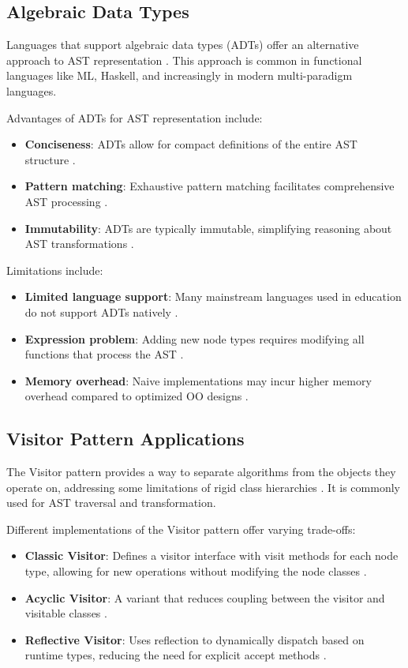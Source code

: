 \subsection{Algebraic Data Types}

Languages that support algebraic data types (ADTs) offer an alternative approach to AST representation \cite{krishnamurthi2007programming}. This approach is common in functional languages like ML, Haskell, and increasingly in modern multi-paradigm languages.

Advantages of ADTs for AST representation include:
\begin{itemize}
    \item \textbf{Conciseness}: ADTs allow for compact definitions of the entire AST structure \cite{krishnamurthi2007programming}.
    \item \textbf{Pattern matching}: Exhaustive pattern matching facilitates comprehensive AST processing \cite{odersky2004overview}.
    \item \textbf{Immutability}: ADTs are typically immutable, simplifying reasoning about AST transformations \cite{okasaki1999purely}.
\end{itemize}

Limitations include:
\begin{itemize}
    \item \textbf{Limited language support}: Many mainstream languages used in education do not support ADTs natively \cite{krishnamurthi2007programming}.
    \item \textbf{Expression problem}: Adding new node types requires modifying all functions that process the AST \cite{wadler1998expression}.
    \item \textbf{Memory overhead}: Naive implementations may incur higher memory overhead compared to optimized OO designs \cite{appel2004modern}.
\end{itemize}

\subsection{Visitor Pattern Applications}

The Visitor pattern provides a way to separate algorithms from the objects they operate on, addressing some limitations of rigid class hierarchies \cite{gamma1995design}. It is commonly used for AST traversal and transformation.

Different implementations of the Visitor pattern offer varying trade-offs:
\begin{itemize}
    \item \textbf{Classic Visitor}: Defines a visitor interface with visit methods for each node type, allowing for new operations without modifying the node classes \cite{gamma1995design}.
    \item \textbf{Acyclic Visitor}: A variant that reduces coupling between the visitor and visitable classes \cite{martin2000acyclic}.
    \item \textbf{Reflective Visitor}: Uses reflection to dynamically dispatch based on runtime types, reducing the need for explicit accept methods \cite{palsberg1998essence}.
\end{itemize}

